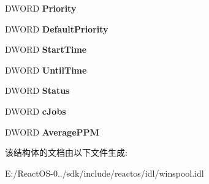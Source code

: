 \begin{DoxyCompactItemize}
D\+W\+O\+RD {\bfseries Priority}
\item 
\mbox{\label{struct___w_i_n_s_p_o_o_l___p_r_i_n_t_e_r___i_n_f_o__2_a76ffebcaf39e40116ddf3491480e1909}} 
D\+W\+O\+RD {\bfseries Default\+Priority}
\item 
\mbox{\label{struct___w_i_n_s_p_o_o_l___p_r_i_n_t_e_r___i_n_f_o__2_aea31401d9c82ef2f8caef6809d6c2627}} 
D\+W\+O\+RD {\bfseries Start\+Time}
\item 
\mbox{\label{struct___w_i_n_s_p_o_o_l___p_r_i_n_t_e_r___i_n_f_o__2_ae0e6336c6798d5467aaa62ea9c1a76f6}} 
D\+W\+O\+RD {\bfseries Until\+Time}
\item 
\mbox{\label{struct___w_i_n_s_p_o_o_l___p_r_i_n_t_e_r___i_n_f_o__2_a34e8b47033c1df037d177aa4d63688ec}} 
D\+W\+O\+RD {\bfseries Status}
\item 
\mbox{\label{struct___w_i_n_s_p_o_o_l___p_r_i_n_t_e_r___i_n_f_o__2_ab7124e1fd7cdd519f9967743bb95d550}} 
D\+W\+O\+RD {\bfseries c\+Jobs}
\item 
\mbox{\label{struct___w_i_n_s_p_o_o_l___p_r_i_n_t_e_r___i_n_f_o__2_a4c357ad83bdf5317fd63e6f084fa80cc}} 
D\+W\+O\+RD {\bfseries Average\+P\+PM}
\end{DoxyCompactItemize}


该结构体的文档由以下文件生成\+:\begin{DoxyCompactItemize}
\item 
E\+:/\+React\+O\+S-\/0../sdk/include/reactos/idl/winspool.\+idl\end{DoxyCompactItemize}
